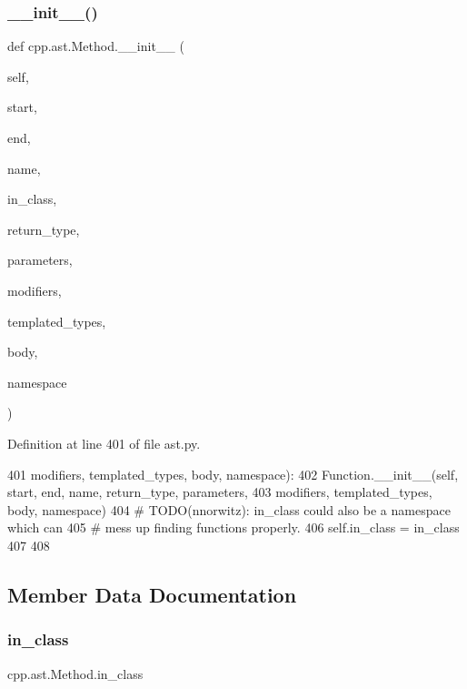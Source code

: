 \subsubsection{\texorpdfstring{\+\_\+\+\_\+init\+\_\+\+\_\+()}{\_\_init\_\_()}}
{\footnotesize\ttfamily def cpp.\+ast.\+Method.\+\_\+\+\_\+init\+\_\+\+\_\+ (\begin{DoxyParamCaption}\item[{}]{self,  }\item[{}]{start,  }\item[{}]{end,  }\item[{}]{name,  }\item[{}]{in\+\_\+class,  }\item[{}]{return\+\_\+type,  }\item[{}]{parameters,  }\item[{}]{modifiers,  }\item[{}]{templated\+\_\+types,  }\item[{}]{body,  }\item[{}]{namespace }\end{DoxyParamCaption})}



Definition at line 401 of file ast.\+py.


\begin{DoxyCode}
401                  modifiers, templated\_types, body, namespace):
402         Function.\_\_init\_\_(self, start, end, name, return\_type, parameters,
403                           modifiers, templated\_types, body, namespace)
404         \textcolor{comment}{# TODO(nnorwitz): in\_class could also be a namespace which can}
405         \textcolor{comment}{# mess up finding functions properly.}
406         self.in\_class = in\_class
407 
408 
\end{DoxyCode}


\subsection{Member Data Documentation}
\mbox{\label{classcpp_1_1ast_1_1Method_aa67244c3673afed43398b5d3e3fa6c1c}} 
\subsubsection{\texorpdfstring{in\+\_\+class}{in\_class}}
{\footnotesize\ttfamily cpp.\+ast.\+Method.\+in\+\_\+class}



